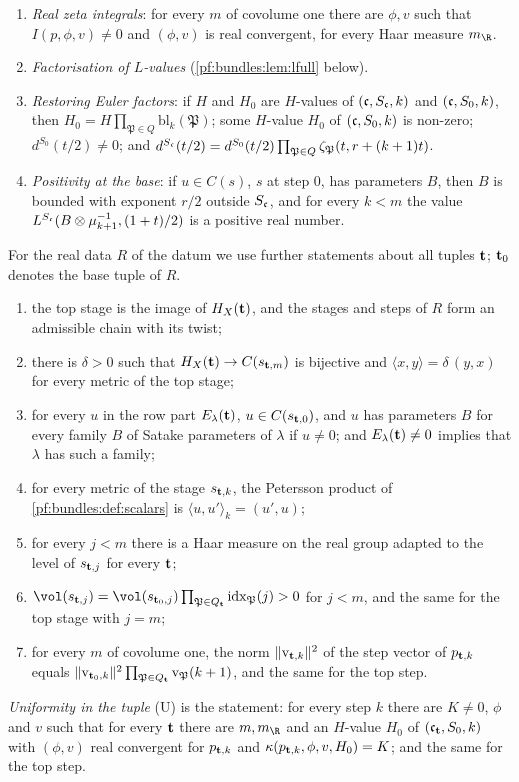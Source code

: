 \begin{definition}
\begin{enumerate}[label=(S\arabic*)]
\item \emph{Real zeta integrals}: for every $m$ of covolume one there are $\phi,v$ such that $I(p,\phi,v)\ne0$ and $(\phi,v)$ is real convergent,
for every Haar measure $m_\R$.
\item \emph{Factorisation of $L$-values} (\cref{pf:bundles:lem:lfull} below).
\item \emph{Restoring Euler factors}: if $H$ and $H_0$ are $H$-values of $(\mathfrak c,S_\mathfrak c,k)$ and $(\mathfrak c,S_0,k)$, then
$H_0=H\prod_{\mathfrak P\in Q}\mathrm{bl}_k(\mathfrak P)$; some $H$-value $H_0$ of $(\mathfrak c,S_0,k)$ is non-zero; $d^{S_0}(t/2)\ne0$; and
$d^{S_\mathfrak c}(t/2)=d^{S_0}(t/2)\prod_{\mathfrak P\in Q}\zeta_{\mathfrak P}(t,r+(k+1)t)$.
\item \emph{Positivity at the base}: if $u\in C(s)$, $s$ at step $0$, has parameters $B$, then $B$ is bounded with exponent $r/2$ outside
$S_\mathfrak c$, and for every $k<m$ the value $L^{S_\mathfrak c}(B\otimes\mu_{k+1}^{-1},(1+t)/2)$ is a positive real number.
\end{enumerate}
For the real data $R$ of the datum we use further statements about all tuples $\mathbf t$; $\mathbf t_0$ denotes the base tuple of $R$.
\begin{enumerate}[label=(R\arabic*)]
\item the top stage is the image of $H_X(\mathbf t)$, and the stages and steps of $R$ form an admissible chain with its twist;
\item there is $\delta>0$ such that $H_X(\mathbf t)\to C(s_{\mathbf t,m})$ is bijective and $\langle x,y\rangle=\delta\,(y,x)$ for every metric of
the top stage;
\item for every $u$ in the row part $E_\lambda(\mathbf t)$, $u\in C(s_{\mathbf t,0})$, and $u$ has parameters $B$ for every family $B$ of Satake
parameters of $\lambda$ if $u\ne0$; and $E_\lambda(\mathbf t)\neq0$ implies that $\lambda$ has such a family;
\item for every metric of the stage $s_{\mathbf t,k}$, the Petersson product of \cref{pf:bundles:def:scalars} is $\langle u,u'\rangle_k=(u',u)$;
\item for every $j<m$ there is a Haar measure on the real group adapted to the level of $s_{\mathbf t,j}$ for every $\mathbf t$;
\item $\vol(s_{\bundt,j})=\vol(s_{\bundt_0,j})\prod_{\mathfrak P\in Q_\bundt}\mathrm{idx}_{\mathfrak P}(j)>0$ for $j<m$, and the same for the top
stage with $j=m$;
\item for every $m$ of covolume one, the norm $\|\mathrm v_{\mathbf t,k}\|^2$ of the step vector of $p_{\mathbf t,k}$ equals
$\|\mathrm v_{\mathbf t_0,k}\|^2\prod_{\mathfrak P\in Q_\mathbf t}\mathrm v_{\mathfrak P}(k+1)$, and the same for the top step.
\end{enumerate}
\emph{Uniformity in the tuple} (U) is the statement: for every step $k$ there are $K\ne0$, $\phi$ and $v$ such that for every $\mathbf t$ there are
$m,m_\R$ and an $H$-value $H_0$ of $(\mathfrak c_\mathbf t,S_0,k)$ with $(\phi,v)$ real convergent for $p_{\mathbf t,k}$ and $\kappa(p_{\mathbf t,k},\phi,v,H_0)=K$;
and the same for the top step.
\end{definition}


